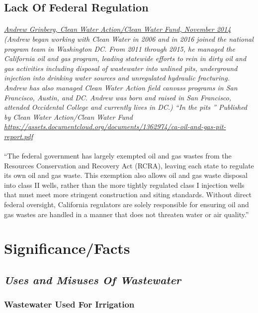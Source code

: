 \documentclass{article}
\begin{document}
\subsection{Lack Of Federal Regulation}
\paragraph{}
\small
\textit{  
\underline{Andrew Grinberg, Clean Water Action/Clean Water Fund, November 2014}
  (Andrew began working with Clean Water in 2006 and in 2016 joined the national program team in Washington DC. From 2011 through 2015, he managed the California oil and gas program, leading statewide efforts to rein in dirty oil and gas activities including disposal of wastewater into unlined pits, underground injection into drinking water sources and unregulated hydraulic fracturing. Andrew has also managed Clean Water Action field canvass programs in San Francisco, Austin, and DC. Andrew was born and raised in San Francisco, attended Occidental College and currently lives in DC.) “In the pits ” Published by Clean Water Action/Clean Water Fund 
\url{https://assets.documentcloud.org/documents/1362974/ca-oil-and-gas-pit-report.pdf} }
\normalsize
\paragraph{}
``The federal government has largely exempted oil and gas wastes from the Resources Conservation and Recovery Act (RCRA), leaving each state to regulate its own oil and gas waste. This exemption also allows oil and gas waste disposal into class II wells, rather than the more tightly regulated class I injection wells that must meet more stringent construction and siting standards. Without direct federal oversight, California regulators are solely responsible for ensuring oil and gas wastes are handled in a manner that does not threaten water or air quality.''

\section{Significance/Facts}

\subsection{\emph{Uses and Misuses Of Wastewater}}

\subsubsection{Wastewater Used For Irrigation}
\end{document}
